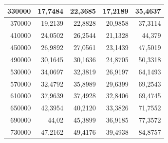 \documentclass[a4paper, 12pt]{article}
\begin{document}
\begin{longtable}[c]{@{}rrrrr@{}}
	\multicolumn{1}{|r|}{330000}                  & \multicolumn{1}{r|}{17,7484}       & \multicolumn{1}{r|}{22,3685}       & \multicolumn{1}{r|}{17,2189}       & \multicolumn{1}{r|}{35,4637}       \\* \midrule
	\multicolumn{1}{|r|}{370000}                  & \multicolumn{1}{r|}{19,2139}       & \multicolumn{1}{r|}{22,8828}       & \multicolumn{1}{r|}{20,9858}       & \multicolumn{1}{r|}{37,3114}       \\* \midrule
	\multicolumn{1}{|r|}{410000}                  & \multicolumn{1}{r|}{24,0502}       & \multicolumn{1}{r|}{26,2544}       & \multicolumn{1}{r|}{21,1328}       & \multicolumn{1}{r|}{44,379}        \\* \midrule
	\multicolumn{1}{|r|}{450000}                  & \multicolumn{1}{r|}{26,9892}       & \multicolumn{1}{r|}{27,0561}       & \multicolumn{1}{r|}{23,1439}       & \multicolumn{1}{r|}{47,5019}       \\* \midrule
	\multicolumn{1}{|r|}{490000}                  & \multicolumn{1}{r|}{30,1645}       & \multicolumn{1}{r|}{30,1636}       & \multicolumn{1}{r|}{24,8705}       & \multicolumn{1}{r|}{50,3318}       \\* \midrule
	\multicolumn{1}{|r|}{530000}                  & \multicolumn{1}{r|}{34,0697}       & \multicolumn{1}{r|}{32,3819}       & \multicolumn{1}{r|}{26,9197}       & \multicolumn{1}{r|}{64,1493}       \\* \midrule
	\multicolumn{1}{|r|}{570000}                  & \multicolumn{1}{r|}{32,4792}       & \multicolumn{1}{r|}{35,8989}       & \multicolumn{1}{r|}{29,6399}       & \multicolumn{1}{r|}{69,2543}       \\* \midrule
	\multicolumn{1}{|r|}{610000}                  & \multicolumn{1}{r|}{37,9639}       & \multicolumn{1}{r|}{37,4928}       & \multicolumn{1}{r|}{32,8406}       & \multicolumn{1}{r|}{69,4745}       \\* \midrule
	\multicolumn{1}{|r|}{650000}                  & \multicolumn{1}{r|}{42,3954}       & \multicolumn{1}{r|}{40,2120}       & \multicolumn{1}{r|}{33,3826}       & \multicolumn{1}{r|}{71,7552}       \\* \midrule
	\multicolumn{1}{|r|}{690000}                  & \multicolumn{1}{r|}{44,02}         & \multicolumn{1}{r|}{45,3899}       & \multicolumn{1}{r|}{36,9185}       & \multicolumn{1}{r|}{77,3572}       \\* \midrule
	\multicolumn{1}{|r|}{730000}                  & \multicolumn{1}{r|}{47,2162}       & \multicolumn{1}{r|}{49,4176}       & \multicolumn{1}{r|}{39,4938}       & \multicolumn{1}{r|}{84,8757}       \\* \midrule

\end{longtable}
\end{document}
